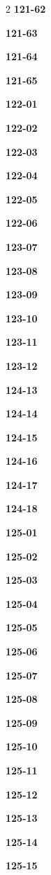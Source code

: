 \documentclass[10pt,a4paper]{article}
\begin{document}
\begin{multicols}{2}
\noindent\textbf{121-62}\ \par
\noindent\textbf{121-63}\ \par
\noindent\textbf{121-64}\ \par
\noindent\textbf{121-65}\ \par
\noindent\textbf{122-01}\ \par
\noindent\textbf{122-02}\ \par
\noindent\textbf{122-03}\ \par
\noindent\textbf{122-04}\ \par
\noindent\textbf{122-05}\ \par
\noindent\textbf{122-06}\ \par
\noindent\textbf{123-07}\ \par
\noindent\textbf{123-08}\ \par
\noindent\textbf{123-09}\ \par
\noindent\textbf{123-10}\ \par
\noindent\textbf{123-11}\ \par
\noindent\textbf{123-12}\ \par
\noindent\textbf{124-13}\ \par
\noindent\textbf{124-14}\ \par
\noindent\textbf{124-15}\ \par
\noindent\textbf{124-16}\ \par
\noindent\textbf{124-17}\ \par
\noindent\textbf{124-18}\ \par
\noindent\textbf{125-01}\ \par
\noindent\textbf{125-02}\ \par
\noindent\textbf{125-03}\ \par
\noindent\textbf{125-04}\ \par
\noindent\textbf{125-05}\ \par
\noindent\textbf{125-06}\ \par
\noindent\textbf{125-07}\ \par
\noindent\textbf{125-08}\ \par
\noindent\textbf{125-09}\ \par
\noindent\textbf{125-10}\ \par
\noindent\textbf{125-11}\ \par
\noindent\textbf{125-12}\ \par
\noindent\textbf{125-13}\ \par
\noindent\textbf{125-14}\ \par
\noindent\textbf{125-15}\ \par

\end{multicols}
\end{document}
